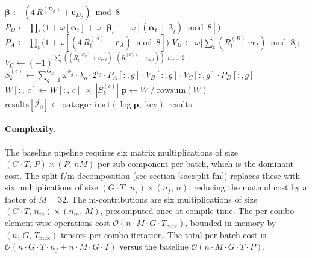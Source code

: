 \documentclass[a4paper,onecolumn,11pt,accepted=2026-06-10]{quantumarticle}
\begin{document}
\begin{algorithm}[H]
\begin{algorithmic}[1]
                       $\boldsymbol{\beta} \gets (4\, R^{(D_\beta)} + \mathbf{c}_{D_\beta}) \bmod 8$
                \State $P_D \gets \textstyle\prod_t \bigl(1 + \omega[\boldsymbol{\alpha}_t] + \omega[\boldsymbol{\beta}_t] - \omega[(\boldsymbol{\alpha}_t\!+\!\boldsymbol{\beta}_t) \bmod 8]\bigr)$
                \Statex
                \State {}
                \State $P_A \gets \textstyle\prod_t \bigl(1 + \omega[(4\, R^{(A)}_t + \mathbf{c}_A) \bmod 8]\bigr)$
                \Statex
                \State {}
                \State $V_B \gets \omega\bigl[\textstyle\sum_t (R^{(B)}_t \cdot \boldsymbol{\tau}_t) \bmod 8\bigr]$;\quad
                        $V_C \gets (-1)^{\sum_t ((R^{(C_\psi)}_t + c_{\psi,t}) \cdot (R^{(C_\phi)}_t + c_{\phi,t})) \bmod 2}$
                \Statex
                \State {}
                \State $S_k^{(c)} \gets \textstyle\sum_{g=1}^{G_k}
                       \omega^{\phi_g} \cdot \lambda_g \cdot 2^{r_g}
                       \cdot P_A[:,g] \cdot V_B[:,g] \cdot V_C[:,g] \cdot P_D[:,g]$
                \State $W[:,\, c] \gets W[:,\, c] \;\times\; |S_k^{(c)}|$
            \EndFor
        \EndFor
        \Statex
        \State {}
        \State $\mathbf{p} \gets W \;/\; \mathrm{rowsum}(W)$
        \State $\mathrm{results}[\overline{\mathcal{I}_0}] \gets \texttt{categorical}(\log \mathbf{p},\; \mathrm{key})$
    \EndFor
    \State \Return results
\EndFunction
\end{algorithmic}
\end{algorithm}
\vspace{-1cm}
\paragraph{Complexity.}
The baseline pipeline requires six matrix multiplications of size
$(G \cdot T,\, P) \times (P,\, nM)$ per sub-component per batch, which is the
dominant cost. The split f/m decomposition (see section \ref{sec:split-fm})
replaces these with six multiplications of size
$(G \cdot T,\, n_f) \times (n_f,\, n)$, reducing the matmul cost by a factor
of $M = 32$. The m-contributions are six multiplications of size
$(G \cdot T,\, n_m) \times (n_m,\, M)$, precomputed once at compile time.
The per-combo element-wise operations cost
$\mathcal{O}(n \cdot M \cdot G \cdot T_{\max})$, bounded in memory by
$(n,\, G,\, T_{\max})$ tensors per combo iteration. The total per-batch cost
is $\mathcal{O}(n \cdot G \cdot T \cdot n_f + n \cdot M \cdot G \cdot T)$
versus the baseline $\mathcal{O}(n \cdot M \cdot G \cdot T \cdot P)$.
\end{document}
